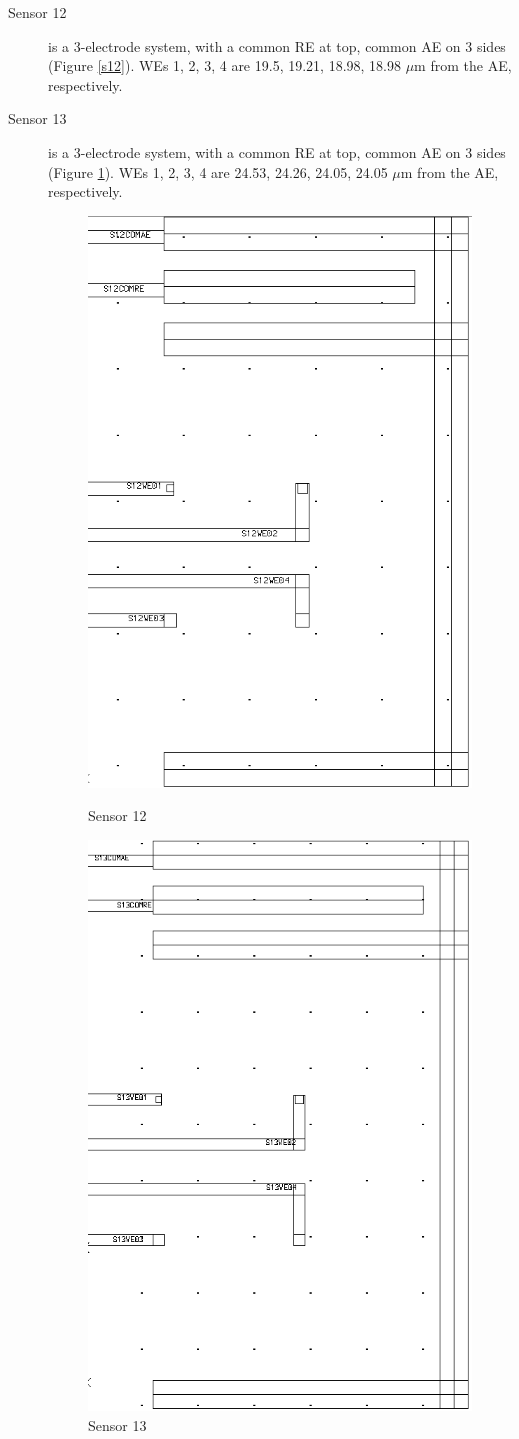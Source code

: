 \begin{description}
\item[Sensor 12] is a 3-electrode system, with a common RE at top, common AE on 3 sides (Figure \ref{s12}). WEs 1, 2, 3, 4 are 19.5, 19.21, 18.98, 18.98 $\mu \mathrm{m}$ from the AE, respectively.
\item[Sensor 13] is a 3-electrode system, with a common RE at top, common AE on 3 sides (Figure \ref{s13}). WEs 1, 2, 3, 4 are 24.53, 24.26, 24.05, 24.05 $\mu \mathrm{m}$ from the AE, respectively.

\begin{figure}
	\begin{minipage}{0.5\linewidth}
		\centering
		\includegraphics[width=0.6\linewidth]{figures/s12.png}
		\caption{Sensor 12}
		\label{s12}
	\end{minipage}
	\begin{minipage}{0.5\linewidth}
		\centering
		\includegraphics[width=0.6\linewidth]{figures/s13.png}
		\caption{Sensor 13}
		\label{s13}
	\end{minipage}
\end{figure}


\end{description}

